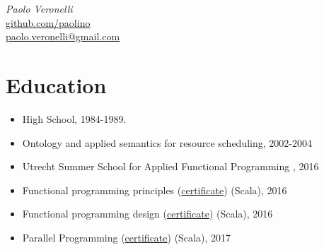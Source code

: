 \documentclass[letterpaper,10pt,oneside]{article}
\begin{document}
    \begin{center}
        \Huge{\textit{Paolo Veronelli}} \\
        \vspace{1em}
        \normalsize{\href{https://github.com/paolino}{github.com/paolino}} \\ 
        \normalsize{\href{mailto:paolo.veronelli@gmail.com}{paolo.veronelli@gmail.com}}
    \end{center}

    \section*{Education}
        \begin{itemize}
            \item High School, 1984-1989.
            \item Ontology and applied semantics for resource scheduling, 2002-2004 
            \item Utrecht Summer School for Applied Functional Programming , 2016
            \item Functional programming principles (\href{https://www.coursera.org/account/accomplishments/certificate/8NVXL4Y3XUB6}{certificate}) (Scala), 2016
            \item Functional programming design (\href{https://www.coursera.org/account/accomplishments/certificate/WTU8B8G54N79}{certificate}) (Scala), 2016
            \item Parallel Programming (\href{https://www.coursera.org/account/accomplishments/certificate/YU7BSRL8VFTT}{certificate}) (Scala), 2017
        \end{itemize}
\end{document}
